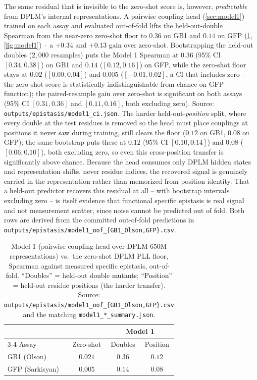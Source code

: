 \documentclass{article}
\begin{document}
The same residual that is invisible to the zero-shot score is, however,
\emph{predictable} from DPLM's internal representations. A pairwise coupling head
(\cref{sec:model1}) trained on each assay and evaluated out-of-fold lifts the
held-out-double Spearman from the near-zero zero-shot floor to $0.36$ on GB1 and
$0.14$ on GFP (\cref{tab:model1}, \cref{fig:model1}) -- a $+0.34$ and $+0.13$ gain
over zero-shot. Bootstrapping the held-out doubles ($2{,}000$ resamples) puts the
Model 1 Spearman at $0.36$ (95\% CI $[0.34, 0.38]$) on GB1 and $0.14$
($[0.12, 0.16]$) on GFP, while the zero-shot floor stays at $0.02$
($[0.00, 0.04]$) and $0.005$ ($[-0.01, 0.02]$, a CI that includes zero -- the
zero-shot score is statistically indistinguishable from chance on GFP function);
the paired-resample gain over zero-shot is significant on both assays
(95\% CI $[0.31, 0.36]$ and $[0.11, 0.16]$, both excluding zero). Source:
\texttt{outputs/epistasis/model1\_ci.json}.
The harder held-out-\emph{position} split, where every double at the test
residues is removed so the head must place couplings at positions it never saw
during training, still clears the floor ($0.12$ on GB1, $0.08$ on GFP); the same
bootstrap puts these at $0.12$ (95\% CI $[0.10, 0.14]$) and $0.08$
($[0.06, 0.10]$), both excluding zero, so even this cross-position transfer is
significantly above chance. Because
the head consumes only DPLM hidden states and representation shifts, never residue
indices, the recovered signal is genuinely carried in the representation rather
than memorized from position identity. That a held-out predictor recovers this
residual at all -- with bootstrap intervals excluding zero -- is itself evidence
that functional specific epistasis is real signal and not measurement scatter,
since noise cannot be predicted out of fold. Both rows are derived from the committed
out-of-fold predictions in \texttt{outputs/epistasis/model1\_oof\_\{GB1\_Olson,GFP\}.csv}.

\begin{table}[t]
  \centering
  \caption{Model 1 (pairwise coupling head over DPLM-650M representations) vs.\ the
  zero-shot DPLM PLL floor, Spearman against measured specific epistasis,
  out-of-fold. ``Doubles'' = held-out double mutants; ``Position'' = held-out
  residue positions (the harder transfer). Source:
  \texttt{outputs/epistasis/model1\_oof\_\{GB1\_Olson,GFP\}.csv} and the matching
  \texttt{model1\_*\_summary.json}.}
  \label{tab:model1}
  \small
  \setlength{\tabcolsep}{5pt}
  \begin{tabular}{lccc}
    \toprule
    & & \multicolumn{2}{c}{Model 1} \\
    \cmidrule(lr){3-4}
    Assay & Zero-shot & Doubles & Position \\
    \midrule
    GB1 (Olson) & $0.021$ & $0.36$ & $0.12$ \\
    GFP (Sarkisyan) & $0.005$ & $0.14$ & $0.08$ \\
    \bottomrule
  \end{tabular}
\end{table}
\end{document}

